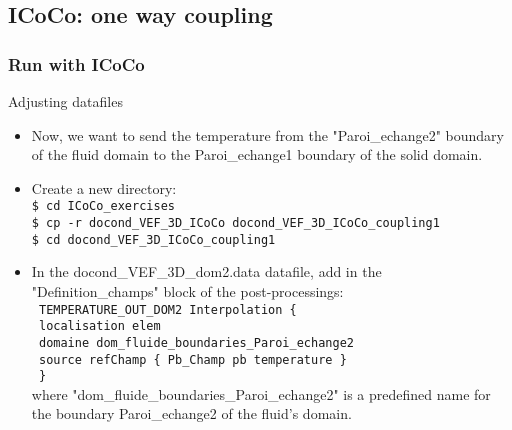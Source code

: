 \documentclass[10pt, hyperref={unicode=true,pdfusetitle, bookmarks=true,bookmarksnumbered=false,bookmarksopen=false, breaklinks=false,pdfborder={0 0 1},backref=true,colorlinks=true,linkcolor=darkblue,pageanchor, urlcolor=darkblue}]{beamer}
\begin{document}
\subsection{{\bf{ICoCo: one way coupling}}}
\begin{frame}
\end{frame}
\begin{frame}
\frametitle{Run with ICoCo}

\begin{block}{Adjusting datafiles}
\begin{itemize}
\item Now, we want to send the temperature from the "Paroi\_echange2" boundary of the fluid domain to the Paroi\_echange1 boundary of the solid domain.
\item Create a new directory:\\
\texttt{\$ cd ICoCo\_exercises}\\
\texttt{\$ cp -r docond\_VEF\_3D\_ICoCo docond\_VEF\_3D\_ICoCo\_coupling1}\\
\texttt{\$ cd docond\_VEF\_3D\_ICoCo\_coupling1}\\


\item In the docond\_VEF\_3D\_dom2.data datafile, add in the "Definition\_champs" block of the post-processings:\\
\texttt{ \hspace{0.2cm} TEMPERATURE\_OUT\_DOM2 Interpolation \{             } \\
\texttt{ \hspace{0.5cm}    localisation elem                                } \\
\texttt{ \hspace{0.5cm}    domaine dom\_fluide\_boundaries\_Paroi\_echange2 } \\
\texttt{ \hspace{0.5cm}    source refChamp \{ Pb\_Champ pb temperature \}   } \\
\texttt{ \hspace{0.2cm} \}                                                  } \\
where "dom\_fluide\_boundaries\_Paroi\_echange2" is a predefined name for the boundary Paroi\_echange2 of the fluid's domain.
\end{itemize}
\end{block}

\end{frame}
\end{document}
